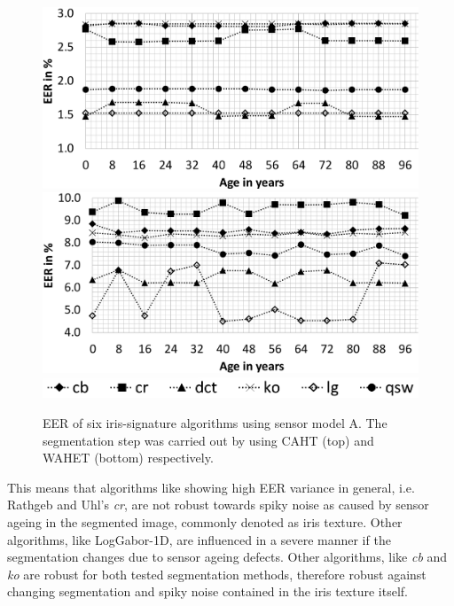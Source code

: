 \documentclass[10pt,twocolumn,letterpaper]{article}
\begin{document}
 
  \begin{figure}
  \centering
  \includegraphics[width=\linewidth]{img/sensor1_caht.png}
  \includegraphics[width=\linewidth]{img/sensor1_wahet.png}
  \includegraphics[width=0.8\linewidth]{img/legend_sensor1.png}
  \caption{EER of six iris-signature algorithms using sensor model A. The segmentation step was carried out by using CAHT (top) and WAHET (bottom) respectively.}
  \label{fig:sensor1}
\end{figure}

This means that algorithms like showing high EER variance in general, i.e. Rathgeb and Uhl's \emph{cr}, are not robust towards spiky noise as caused by sensor ageing in the segmented image, commonly denoted as iris texture. Other algorithms, like LogGabor-1D, are influenced in a severe manner if the segmentation changes due to sensor ageing defects. Other algorithms, like \emph{cb} and \emph{ko} are robust for both tested segmentation methods, therefore robust against changing segmentation and spiky noise contained in the iris texture itself.
\end{document}
